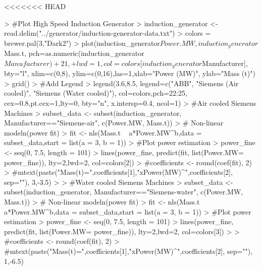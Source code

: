 \documentclass{article}
\begin{document}
<<<<<<< HEAD
\begin{Schunk}
\begin{Sinput}
> #Plot High Speed Induction Generator
> induction_generator <- read.delim("../generator/induction-generator-data.txt")
> colors = brewer.pal(3,"Dark2")
> plot(induction_generator$Power.MW, induction_generator$Mass.t, pch=as.numeric(induction_generator$Manufacturer)+21, 
+      lwd=1, col=colors[induction_generator$Manufacturer], bty="l", xlim=c(0,8), ylim=c(0,16),las=1,xlab="Power (MW)", ylab="Mass (t)")
> grid()
> #Add Legend
> legend(3.6,8.5, legend=c("ABB", "Siemens (Air cooled)", "Siemens (Water cooled)"), col=colors,pch=22:25, cex=0.8,pt.cex=1,lty=0, bty="n", x.intersp=0.4, ncol=1)
> #Air cooled Siemens Machines
> subset_data <- subset(induction_generator, Manufacturer=="Siemens-air", c(Power.MW, Mass.t))
> # Non-linear modeln(power fit)
> fit <- nls(Mass.t ~ a*Power.MW^b,data = subset_data,start = list(a = 3, b = 1))
> #Plot power estimation
> power_fine <- seq(0, 7.5, length = 101)
> lines(power_fine, predict(fit, list(Power.MW= power_fine)), lty=2,lwd=2, col=colors[2])
> #coefficients <- round(coef(fit), 2) 
> #mtext(paste("Mass(t)=",coefficients[1],"xPower(MW)^",coefficients[2], sep=""), 3,-3.5)
> 
> #Water cooled Siemens Machines
> subset_data <- subset(induction_generator, Manufacturer=="Siemens-water", c(Power.MW, Mass.t))
> # Non-linear modeln(power fit)
> fit <- nls(Mass.t ~ a*Power.MW^b,data = subset_data,start = list(a = 3, b = 1))
> #Plot power estimation
> power_fine <- seq(0, 7.5, length = 101)
> lines(power_fine, predict(fit, list(Power.MW= power_fine)), lty=2,lwd=2, col=colors[3])
> 
> #coefficients <- round(coef(fit), 2) 
> #mtext(paste("Mass(t)=",coefficients[1],"xPower(MW)^",coefficients[2], sep=""), 1,-6.5)
\end{Sinput}
\end{Schunk}
\end{document}
